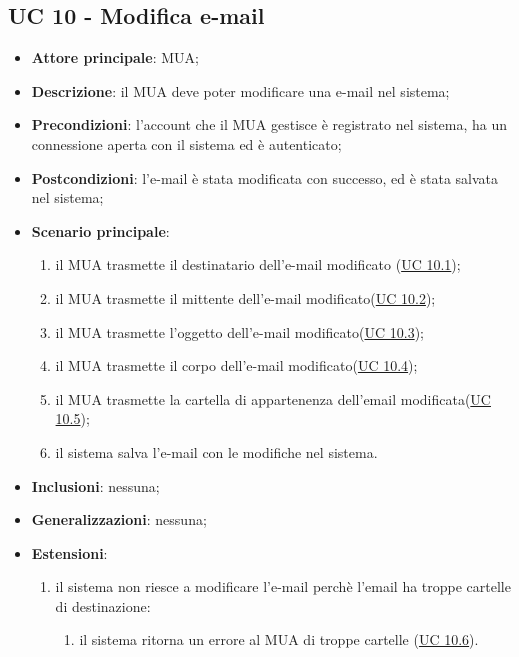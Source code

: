 \subsection{UC 10 - Modifica e-mail} \label{sec:UC10}
    \begin{itemize}
        \item \textbf{Attore principale}: MUA;
        \item \textbf{Descrizione}: il MUA deve poter modificare una e-mail nel sistema;
        \item \textbf{Precondizioni}: l’account che il MUA gestisce è registrato nel sistema, ha un connessione aperta con il sistema ed è autenticato;
        \item \textbf{Postcondizioni}: l'e-mail è stata modificata con successo, ed è stata salvata nel sistema;
        \item \textbf{Scenario principale}:
            \begin{enumerate}
                \item il MUA trasmette il destinatario dell'e-mail modificato (\hyperref[sec:UC10.1]{UC 10.1});
                \item il MUA trasmette il mittente dell'e-mail modificato(\hyperref[sec:UC10.2]{UC 10.2});
                \item il MUA trasmette l'oggetto dell'e-mail modificato(\hyperref[sec:UC10.3]{UC 10.3});
                \item il MUA trasmette il corpo dell'e-mail modificato(\hyperref[sec:UC10.4]{UC 10.4});
                \item il MUA trasmette la cartella di appartenenza dell'email modificata(\hyperref[sec:UC10.5]{UC 10.5});
                \item il sistema salva l'e-mail con le modifiche nel sistema.
            \end{enumerate}
        \item \textbf{Inclusioni}: nessuna;
        \item \textbf{Generalizzazioni}: nessuna;
        \item \textbf{Estensioni}: 
            \begin{enumerate}[label=\alph*.]
                \item il sistema non riesce a modificare l'e-mail perchè l'email ha troppe cartelle di destinazione:
                \begin{enumerate}[label=\arabic*.]
                    \item il sistema ritorna un errore al MUA di troppe cartelle (\hyperref[sec:UC10.6]{UC 10.6}).
                \end{enumerate}
            \end{enumerate}
    \end{itemize}

